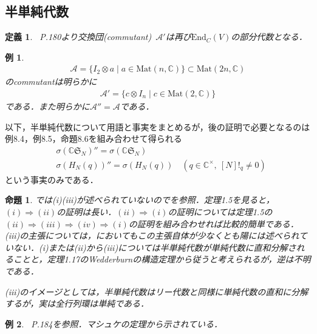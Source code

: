 \documentclass[dvipdfmx]{jsarticle}
\newtheorem{definition}{定義}[section]%
\newtheorem{instance}{例}[section]%
\newtheorem{prop}{命題}[section]
\begin{document}
\subsection*{半単純代数}
%
%
%
%
\setcounter{definition}{0}
\begin{definition}
\cite{okada}{\ }P.180より交換団(commutant){\ }$\mathscr{A}'$は再び$\mathrm{End}_C(V)$の部分代数となる．
\end{definition}
%
%
%
%
\setcounter{instance}{1}
\begin{instance}
\begin{align*}
\mathscr{A}=\{I_2\otimes a\mid a\in \mathrm{Mat}(n,\mathbb{C})\} \subset \mathrm{Mat}(2n,\mathbb{C})
\end{align*}
のcommutantは明らかに
\begin{align*}
\mathscr{A}'=\{c\otimes I_n\mid c\in \mathrm{Mat}(2,\mathbb{C})\}
\end{align*}
である．また明らかに$\mathscr{A}''=\mathscr{A}$である．
\end{instance}
%
%
%
%
以下，半単純代数について用語と事実をまとめるが，後の証明で必要となるのは例8.4，例8.5，命題8.6を組み合わせて得られる
\begin{align*}
&\sigma(\mathbb{C}\mathfrak{S}_N)''=\sigma(\mathbb{C}\mathfrak{S}_N) \\
&\sigma(H_N(q))''=\sigma(H_N(q)) \quad (q\in\mathbb{C}^\times,{\ }[N]!_q\neq 0)
\end{align*}
という事実のみである．
\setcounter{prop}{2}
\begin{prop}
\cite{okada}では(i)(iii)が述べられていないので\cite{iwahori}を参照．\cite{iwahori}定理1.5を見ると，$(i)\Longrightarrow (ii)$の証明は長い．$(ii)\Longrightarrow (i)$の証明については\cite{iwahori}定理1.5の$(ii)\Longrightarrow (iii)\Longrightarrow (iv)\Longrightarrow (i)$の証明を組み合わせれば比較的簡単である．(iii)の主張については，\cite{iwahori}においてもこの主張自体が少なくとも陽には述べられていない．(i)または(ii)から(iii)については半単純代数が単純代数に直和分解されることと，\cite{iwahori}定理1.17のWedderburnの構造定理から従うと考えられるが，逆は不明である．\par
(iii)のイメージとしては，半単純代数はリー代数と同様に単純代数の直和に分解するが，実は全行列環は単純である．
\end{prop}
%
%
%
%
\setcounter{instance}{3}
\begin{instance}
\cite{okada}{\ }P.184を参照．マシュケの定理から示されている．
\end{instance}
%
%
%
%
\setcounter{prop}{5}
\end{document}
